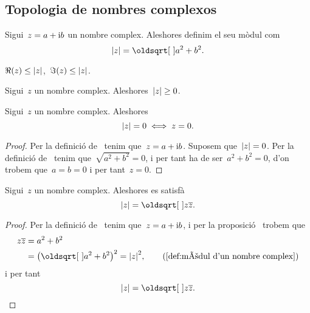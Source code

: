 \documentclass[../Apunts.tex]{subfiles}
\begin{document}
	\subsection{Topologia de nombres complexos}
	\begin{definition}
		\label{def:mòdul d'un nombre complex}
		Sigui~\(z=a+\mathrm{i} b\) un nombre complex.
		Aleshores definim el seu mòdul com
		\[\modul{z}=\sqrt{a^{2}+b^{2}}.\]
	\end{definition}
	\begin{observation}
		\label{obs:les parts real i imaginàries d'un complex són menors %
		que el seu mòdul}
		\label{obs:la part real d'un complex és menor que el seu mòdul}
		\label{obs:la part imaginària d'un complex és menor que el seu mòdul}
		\(\Re(z)\leq\modul{z}\),~\(\Im(z)\leq\modul{z}\).
	\end{observation}
	\begin{observation}
		\label{prop:el mòdul d'un nombre complex és no negatiu}
		Sigui~\(z\) un nombre complex.
		Aleshores~\(\modul{z}\geq0\).
	\end{observation}
	\begin{proposition}
		\label{prop:el mòdul d'un nombre complex és zero %
		si i només si aquest és zero}
		Sigui~\(z\) un nombre complex.
		Aleshores
		\[\modul{z}=0\sii z=0.\]
	\end{proposition}
	\begin{proof}
		Per la definició de~ tenim que~\(z=a+\mathrm{i} b\).
		Suposem que~\(\modul{z}=0\).
		Per la definició de~ tenim
		que~\(\sqrt{a^{2}+b^{2}}=0\), i per tant ha de ser~\(a^{2}+b^{2}=0\),
		d'on trobem que~\(a=b=0\) i per tant~\(z=0\).
	\end{proof}
	\begin{proposition}
		\label{prop:el mòdul d'un nombre complex és l'arrel del nombre %
		pel seu conjugat}
		Sigui~\(z\) un nombre complex.
		Aleshores es satisfà
		\[\modul{z}=\sqrt{z\conjugat{z}}.\]
	\end{proposition}
	\begin{proof}
		Per la definició de~ tenim que~\(z=a+\mathrm{i} b\),
		i per la proposició~
		trobem que
		\begin{align*}
			z\conjugat{z}&=a^{2}+b^{2} \\
			&=\big(\sqrt{a^{2}+b^{2}}\big)^{2}=\modul{z}^{2}, \tag{\ref{def:mòdul d'un nombre complex}}
		\end{align*}
		i per tant 
		\[\modul{z}=\sqrt{z\conjugat{z}}.\qedhere\]
	\end{proof}
\end{document}
